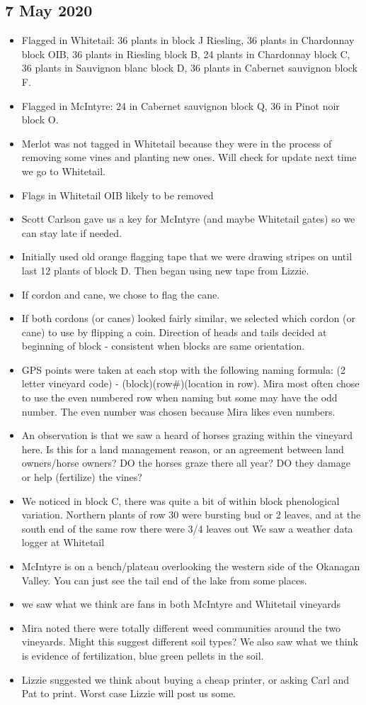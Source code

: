 \documentclass[11pt,letter]{article}
\newenvironment{smitemize}{
\begin{itemize}
  \setlength{\itemsep}{0pt}
  \setlength{\parskip}{0.8pt}
  \setlength{\parsep}{0pt}}
{\end{itemize}
}
\begin{document}
\subsection{7 May 2020}
\begin{smitemize}
\item Flagged in Whitetail: 36 plants in block J Riesling, 36 plants in Chardonnay block OIB, 36 plants in Riesling block B, 24 plants in Chardonnay block C, 36 plants in Sauvignon blanc block D, 36 plants in Cabernet sauvignon block F.
\item Flagged in McIntyre: 24 in Cabernet sauvignon block Q, 36 in Pinot noir block O.
\item Merlot was not tagged in Whitetail because they were in the process of removing some vines and planting new ones. Will check for update next time we go to Whitetail.
\item Flags in Whitetail OIB likely to be removed
\item Scott Carlson gave us a key for McIntyre (and maybe Whitetail gates) so we can stay late if needed.
\item Initially used old orange flagging tape that we were drawing stripes on until last 12 plants of block D. Then began using new tape from Lizzie.
\item If cordon and cane, we chose to flag the cane.
\item If both cordons (or canes) looked fairly similar, we selected which cordon (or cane) to use by flipping a coin. Direction of heads and tails decided at beginning of block - consistent when blocks are same orientation.
\item GPS points were taken at each stop with the following naming formula: (2 letter vineyard code) - (block)(row\#)(location in row). Mira most often chose to use the even numbered row when naming but some may have the odd number. The even number was chosen because Mira likes even numbers.
\item An observation is that we saw a heard of horses grazing within the vineyard here. Is this for a land management reason, or an agreement between land owners/horse owners? DO the horses graze there all year? DO they damage or help (fertilize) the vines? 
\item We noticed in block C, there was quite a bit of within block phenological variation. Northern plants of row 30 were bursting bud or 2 leaves, and at the south end of the same row there were 3/4 leaves out
We saw a weather data logger at Whitetail 
\item McIntyre is on a bench/plateau overlooking the western side of the Okanagan Valley. You can just see the tail end of the lake from some places.
\item we saw what we think are fans in both McIntyre and Whitetail vineyards 
\item Mira noted there were totally different weed communities around the two vineyards. Might this suggest different soil types? We also saw what we think is evidence of fertilization, blue green pellets in the soil.
\item Lizzie suggested we think about buying a cheap printer, or asking Carl and Pat to print. Worst case Lizzie will post us some. 


\end{smitemize}
\end{document}
